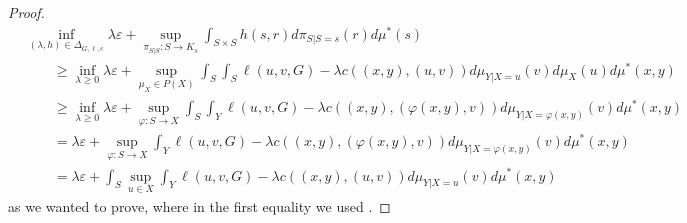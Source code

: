 \documentclass{article}
\newcommand{\D}{\Delta_{G,\ell, c}}
\theoremstyle{definition}
\theoremstyle{remarksty}
\begin{document}
\begin{proof}
\begin{align*}
        &\inf_{(\lambda, h) \in \D} \lambda \varepsilon + \sup_{\pi_{S|S} : S \rightarrow K_s} \int_{S \times S} h(s,r) d\pi_{S|S=s} (r)d\mu^*(s)  \\
        &\qquad\geq \inf_{\lambda \geq 0} \lambda \varepsilon +  \sup_{\mu_X \in P(X)} \int_S  \int_S \ell(u,v,G) - \lambda c((x,y),(u,v)) d \mu_{Y|X=u}(v) d\mu_X(u) d\mu^*(x,y) \\
        &\qquad\geq \inf_{\lambda \geq 0} \lambda \varepsilon +  \sup_{\varphi : S \rightarrow X} \int_S  \int_Y \ell(u,v,G) - \lambda c((x,y),(\varphi(x,y),v)) d \mu_{Y|X=\varphi(x,y)}(v) d\mu^*(x,y)\\
        &\qquad = \lambda \varepsilon +   \sup_{\varphi : S \rightarrow X} \int_Y \ell(u,v,G) - \lambda c((x,y),(\varphi(x,y),v)) d \mu_{Y|X=\varphi(x,y)}(v) d\mu^*(x,y)  \\
        &\qquad= \lambda \varepsilon +  \int_S  \sup_{u \in X} \int_Y \ell(u,v,G) - \lambda c((x,y),(u,v)) d \mu_{Y|X=u}(v) d\mu^*(x,y) 
    \end{align*}
    as we wanted to prove, where in the first equality we used \cite[Theorem 3A]{rockafellar_integral_1976}.
\end{proof}
\end{document}
